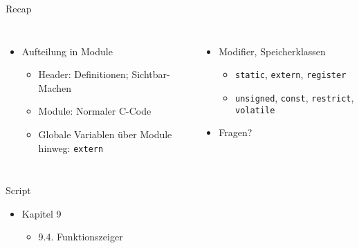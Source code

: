 
\begin{frame}{Recap}
%
\begin{columns}[T]
\begin{itemize}
\item Aufteilung in Module
	\begin{itemize}
	\item Header: Definitionen; Sichtbar-Machen
	\item Module: Normaler C-Code
	\item Globale Variablen über Module hinweg: \texttt{extern}
	\end{itemize}
\end{itemize}
%
\begin{itemize}
\item Modifier, Speicherklassen
	\begin{itemize}
	\item \texttt{static}, \texttt{extern}, \texttt{register}
	\item \texttt{unsigned}, \texttt{const}, \texttt{restrict}, 
		\texttt{volatile}
	\end{itemize}
\item Fragen?
\end{itemize}
\end{columns}
%
\end{frame}


\begin{frame}{Script}
%
\begin{itemize}
\item Kapitel 9
	\begin{itemize}
	\item 9.4. Funktionszeiger
	\end{itemize}
\end{itemize}
%
\end{frame}


